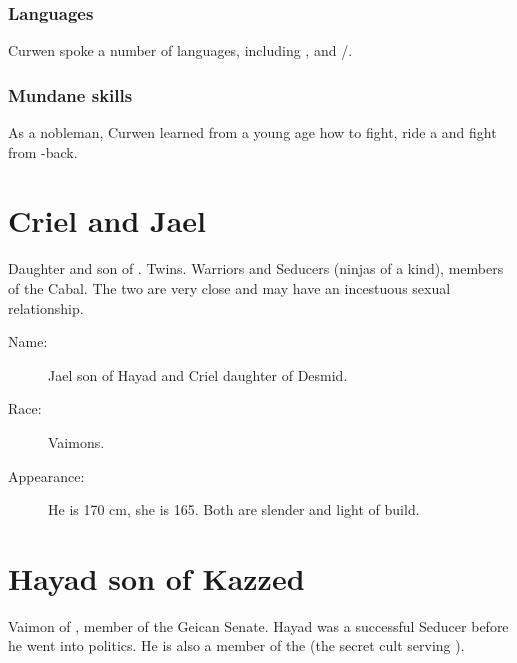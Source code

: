 \subsubsection{Languages}
Curwen spoke a number of languages, including ,  and /. 





\subsubsection{Mundane skills}
As a nobleman, Curwen learned from a young age how to fight, ride a \relc{} and fight from \relc-back. 















\section{Criel and Jael}
Daughter and son of . 
Twins. 
Warriors and Seducers (ninjas of a kind), members of the Cabal. 
The two are very close and may have an incestuous sexual relationship. 

\begin{description}
  \item[Name:] Jael son of Hayad and Criel daughter of Desmid. 
  \item[Race:] Vaimons. 
  \item[Appearance:] He is 170 cm, she is 165. Both are slender and light of build. 
\end{description}
















\section{Hayad son of Kazzed}
Vaimon of \ClanGeican, member of the Geican Senate. 
Hayad was a successful Seducer before he went into politics. He is also a member of the  (the secret cult serving \Belzir). 

